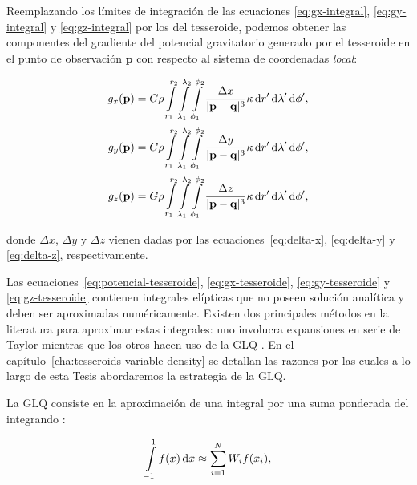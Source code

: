 Reemplazando los límites de integración de las ecuaciones \ref{eq:gx-integral},
\ref{eq:gy-integral} y \ref{eq:gz-integral} por los del tesseroide, podemos
obtener las componentes del gradiente del potencial gravitatorio generado por
el tesseroide en el punto de observación $\mathbf{p}$ con respecto al
sistema de coordenadas \emph{local}:

\begin{align}
    g_x(\mathbf{p}) &=
        G \rho
        \int\limits_{r_1}^{r_2}
        \int\limits_{\lambda_1}^{\lambda_2}
        \int\limits_{\phi_1}^{\phi_2}
        \frac{\Delta x}{|\mathbf{p} - \mathbf{q}|^3}
        \kappa
        \diff r' \diff \lambda' \diff \phi',
    \label{eq:gx-tesseroide}
    \\
    g_y(\mathbf{p}) &=
        G \rho
        \int\limits_{r_1}^{r_2}
        \int\limits_{\lambda_1}^{\lambda_2}
        \int\limits_{\phi_1}^{\phi_2}
        \frac{\Delta y}{|\mathbf{p} - \mathbf{q}|^3}
        \kappa
        \diff r' \diff \lambda' \diff \phi',
    \label{eq:gy-tesseroide}
    \\
    g_z(\mathbf{p}) &=
        G \rho
        \int\limits_{r_1}^{r_2}
        \int\limits_{\lambda_1}^{\lambda_2}
        \int\limits_{\phi_1}^{\phi_2}
        \frac{\Delta z}{|\mathbf{p} - \mathbf{q}|^3}
        \kappa
        \diff r' \diff \lambda' \diff \phi',
    \label{eq:gz-tesseroide}
\end{align}

\noindent donde $\Delta x$, $\Delta y$ y $\Delta z$ vienen dadas por las
ecuaciones~\ref{eq:delta-x}, \ref{eq:delta-y} y \ref{eq:delta-z},
respectivamente.

Las ecuaciones~\ref{eq:potencial-tesseroide}, \ref{eq:gx-tesseroide},
\ref{eq:gy-tesseroide} y \ref{eq:gz-tesseroide} contienen integrales elípticas
que no poseen solución analítica y deben ser aproximadas numéricamente.
Existen dos principales métodos en la literatura para aproximar estas
integrales: uno involucra expansiones en serie de Taylor
\citep{heck2006,grombein2013} mientras que los otros hacen uso de la \ac{GLQ}
\citep{asgharzadeh2007,wildpfeiffer2008,li2011,uieda2016,lin2018}.
En el capítulo~\ref{cha:tesseroids-variable-density} se detallan las razones
por las cuales a lo largo de esta Tesis abordaremos la estrategia de la
\ac{GLQ}.

La \Ac{GLQ} consiste en la aproximación de una integral por una suma ponderada
del integrando \citep[][p.~390]{hildebrand1987}:

\begin{equation}
    \int\limits_{-1}^1 f(x) \mathop{}\!\textnormal{d} x \approx
        \sum\limits_{i=1}^{N} W_i f(x_i),
\end{equation}

